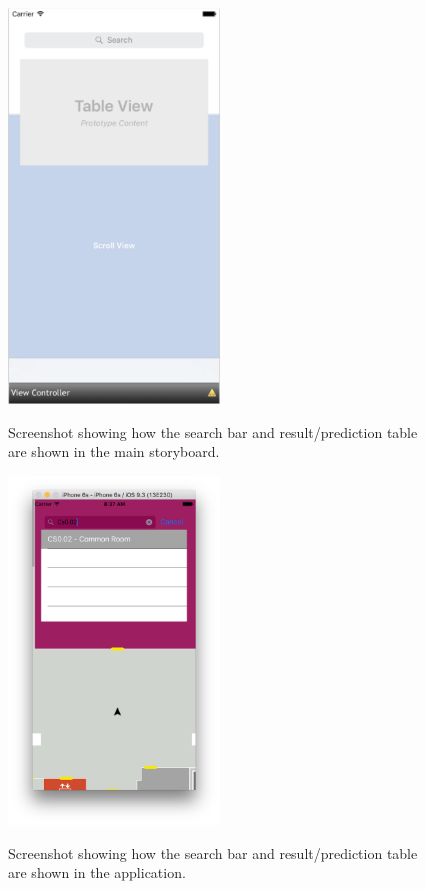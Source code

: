 \documentclass[12pt,a4paper]{report}
\begin{document}
\begin{figure}[]
\centering
\includegraphics[width=0.5\textwidth]{images-implementation/IOSRoomSearchInStoryboard.png}
\label{IOSRoomSearchInStoryboard}
\caption{Screenshot showing how the search bar and result/prediction table are shown in the main storyboard.}
\end{figure}


\begin{figure}[]
\centering
\includegraphics[width=0.5\textwidth]{images-implementation/IOSRoomSearchInApp.png}
\label{IOSRoomSearchInApp}
\caption{Screenshot showing how the search bar and result/prediction table are shown in the application.}
\end{figure}
\end{document}
